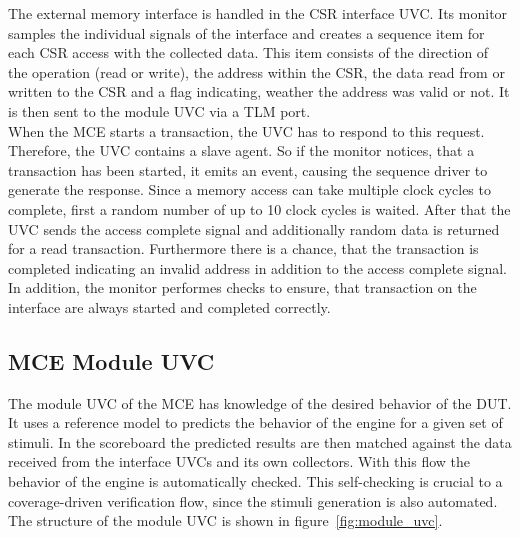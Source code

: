 The external memory interface is handled in the CSR interface UVC.
Its monitor samples the individual signals of the interface and creates a sequence item for each CSR access with the collected data.
This item consists of the direction of the operation (read or write), the address within the CSR, the data read from or written to the CSR and a flag
indicating, weather the address was valid or not. 
It is then sent to the module UVC via a TLM port.\\
When the MCE starts a transaction, the UVC has to respond to this request.
Therefore, the UVC contains a slave agent.
So if the monitor notices, that a transaction has been started, it emits an event, causing the sequence driver to generate the response.
Since a memory access can take multiple clock cycles to complete, first a random number of up to 10 clock cycles is waited.
After that the UVC sends the access complete signal and additionally random data is returned for a read transaction.
Furthermore there is a chance, that the transaction is completed indicating an invalid address in addition to the access complete signal.
In addition, the monitor performes checks to ensure, that transaction on the interface are always started and completed correctly.

\subsection{MCE Module UVC}

The module UVC of the MCE has knowledge of the desired behavior of the DUT.
It uses a reference model to predicts the behavior of the engine for a given set of stimuli.
In the scoreboard the predicted results are then matched against the data received from the interface UVCs and its own collectors.
With this flow the behavior of the engine is automatically checked.
This self-checking is crucial to a coverage-driven verification flow, since the stimuli generation is also automated.
The structure of the module UVC is shown in figure~\ref{fig:module_uvc}.

